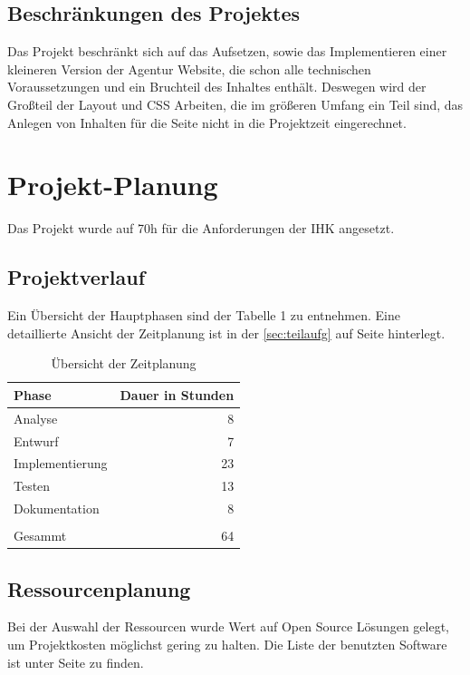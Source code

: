 \documentclass[11pt,a4paper]{article}
\begin{document}
\subsection{Beschränkungen des Projektes}
Das Projekt beschränkt sich auf das Aufsetzen, sowie das Implementieren einer kleineren Version der Agentur Website, die schon alle technischen Voraussetzungen und ein Bruchteil des Inhaltes enthält. Deswegen wird der Großteil der Layout und CSS Arbeiten, die im größeren Umfang ein Teil sind, das Anlegen von Inhalten für die Seite nicht in die Projektzeit eingerechnet.
\section{Projekt-Planung}
Das Projekt wurde auf 70h für die Anforderungen der IHK angesetzt.
\subsection{Projektverlauf}
Ein Übersicht der Hauptphasen sind der Tabelle 1 zu entnehmen. Eine detaillierte Ansicht der Zeitplanung ist in der \ref{sec:teilaufg} auf Seite \pageref{sec:teilaufg} hinterlegt.\\
\begin{table}[!ht]
  \centering
     \begin{tabular}{l|r}
       \textbf{Phase}  & \textbf{Dauer in Stunden} \\
       \hline
      Analyse       & 8                     \\
      Entwurf       & 7             	    \\
      Implementierung       & 23	\\
      Testen       & 13			         \\
       Dokumentation      &  8        \\
       \\
       \hline
       \hline
       Gesammt        & 64               \\
     \end{tabular}
     \caption{Übersicht der Zeitplanung}
\label{tbl:Übersicht der Zeitplanung}
\end{table}
\subsection{Ressourcenplanung}
Bei der Auswahl der Ressourcen wurde Wert auf Open Source Lösungen gelegt, um Projektkosten möglichst gering zu halten. Die Liste der benutzten Software ist unter Seite \pageref{sec:progs}
zu finden.
\end{document}
